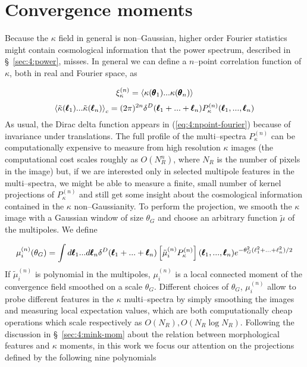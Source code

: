
\section{Convergence moments}
\label{sec:4:moments}
Because the $\kappa$ field in general is non--Gaussian, higher order Fourier statistics might contain cosmological information that the power spectrum, described in \S~\ref{sec:4:power}, misses. In general we can define a $n$--point correlation function of $\kappa$, both in real and Fourier space, as

\begin{equation}
\label{eq:4:npoint-real}
\xi^{(n)}_\kappa = \left\langle\kappa(\pmb{\theta}_1)...\kappa(\pmb{\theta}_n)\right\rangle
\end{equation}
%
\begin{equation}
\label{eq:4:npoint-fourier}
\left\langle\tilde{\kappa}(\pmb{\ell}_1)...\tilde{\kappa}(\pmb{\ell}_n)\right\rangle_c = (2\pi)^{2n} \delta^D(\pmb{\ell}_1+...+\pmb{\ell}_n)P_\kappa^{(n)}(\pmb{\ell}_1,...,\pmb{\ell}_n)
\end{equation}
%
As usual, the Dirac delta function appears in (\ref{eq:4:npoint-fourier}) because of invariance under translations. The full profile of the multi--spectra $P^{(n)}_\kappa$ can be computationally expensive to measure from high resolution $\kappa$ images (the computational cost scales roughly as $O(N_R^n)$, where $N_R$ is the number of pixels in the image) but, if we are interested only in selected multipole features in the multi--spectra, we might be able to measure a finite, small number of kernel projections of $P^{(n)}_\kappa$ and still get some insight about the cosmological information contained in the $\kappa$ non--Gaussianity. To perform the projection, we smooth the $\kappa$ image with a Gaussian window of size $\theta_G$ and choose an arbitrary function $\tilde{\mu}$ of the multipoles. We define

\begin{equation}
\label{eq:4:npoint-projection}
\mu^{(n)}_i(\theta_G) = \int d\pmb{\ell}_1...d\pmb{\ell}_n \delta^D(\pmb{\ell}_1+...+\pmb{\ell}_n)\left[\tilde{\mu}^{(n)}_iP_\kappa^{(n)}\right](\pmb{\ell}_1,...,\pmb{\ell}_n)e^{-\theta_G^2(\ell_1^2+...+\ell_n^2)/2}
\end{equation}
%
If $\tilde{\mu}^{(n)}_i$ is polynomial in the multipoles, $\mu^{(n)}_i$ is a local connected moment of the convergence field smoothed on a scale $\theta_G$. Different choices of $\theta_G$, $\mu^{(n)}_i$ allow to probe different features in the $\kappa$ multi--spectra by simply smoothing the images and measuring local expectation values, which are both computationally cheap operations which scale respectively as $O(N_R), O(N_R\log N_R)$. Following the discussion in \S~\ref{sec:4:mink-mom} about the relation between morphological features and $\kappa$ moments, in this work we focus our attention on the projections defined by the following nine polynomials

